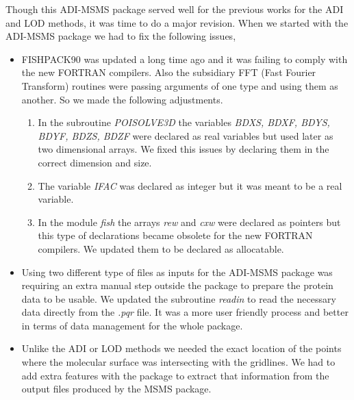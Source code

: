 


Though this ADI-MSMS package served well for the previous works for the ADI and LOD methods, it was time to do a major revision. When we started with the ADI-MSMS package we had to fix the following issues,

\begin{itemize}
	\item FISHPACK90 was updated a long time ago and it was failing to comply with the new FORTRAN compilers. Also the subsidiary FFT (Fast Fourier Transform) routines were passing arguments of one type and using them as another. So we made the following adjustments.
		\begin{enumerate}
			\item In the subroutine {\it POISOLVE3D} the variables {\it BDXS, BDXF, BDYS, BDYF, BDZS, BDZF} were declared as real variables but used later as two dimensional arrays. We fixed this issues by declaring them in the correct dimension and size.
			\item The variable {\it IFAC} was declared as integer but it was meant to be a real variable.
			\item In the module {\it fish} the arrays {\it rew} and {\it cxw} were declared as pointers but this type of declarations became obsolete for the new FORTRAN compilers. We updated them to be declared as allocatable.  
		\end{enumerate}
	\item Using two different type of files as inputs for the ADI-MSMS package was requiring an extra manual step outside the package to prepare the protein data to be usable. We updated the subroutine {\it readin} to read the necessary data directly from the {\it .pqr} file. It was a more user friendly process and better in terms of data management for the whole package.
	\item Unlike the ADI or LOD methods we needed the exact location of the points where the molecular surface was intersecting with the gridlines. We had to add extra features with the package to extract that information from the output files produced by the MSMS package.     
\end{itemize}  

